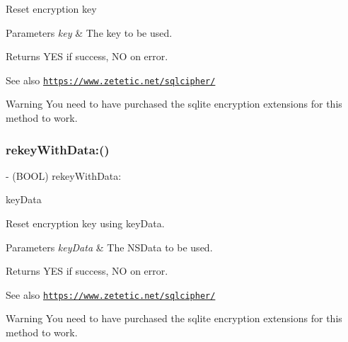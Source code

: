 Reset encryption key


\begin{DoxyParams}{Parameters}
{\em key} & The key to be used.\\
\hline
\end{DoxyParams}
\begin{DoxyReturn}{Returns}
{\ttfamily Y\+ES} if success, {\ttfamily NO} on error.
\end{DoxyReturn}
\begin{DoxySeeAlso}{See also}
\href{https://www.zetetic.net/sqlcipher/}{\tt https\+://www.\+zetetic.\+net/sqlcipher/}
\end{DoxySeeAlso}
\begin{DoxyWarning}{Warning}
You need to have purchased the sqlite encryption extensions for this method to work. 
\end{DoxyWarning}
\mbox{\label{interface_o_p_t_l_y_f_m_d_b_database_ae1454ed91642c4d127fd36f370f04d8c}} 
\subsubsection{\texorpdfstring{rekey\+With\+Data\+:()}{rekeyWithData:()}}
{\footnotesize\ttfamily -\/ (B\+O\+OL) rekey\+With\+Data\+: \begin{DoxyParamCaption}\item[{(N\+S\+Data $\ast$)}]{key\+Data }\end{DoxyParamCaption}}

Reset encryption key using {\ttfamily key\+Data}.


\begin{DoxyParams}{Parameters}
{\em key\+Data} & The {\ttfamily N\+S\+Data} to be used.\\
\hline
\end{DoxyParams}
\begin{DoxyReturn}{Returns}
{\ttfamily Y\+ES} if success, {\ttfamily NO} on error.
\end{DoxyReturn}
\begin{DoxySeeAlso}{See also}
\href{https://www.zetetic.net/sqlcipher/}{\tt https\+://www.\+zetetic.\+net/sqlcipher/}
\end{DoxySeeAlso}
\begin{DoxyWarning}{Warning}
You need to have purchased the sqlite encryption extensions for this method to work. 
\end{DoxyWarning}
\mbox{\label{interface_o_p_t_l_y_f_m_d_b_database_afb6f13df41c3e8e1813a00f6d1ec0428}} 
